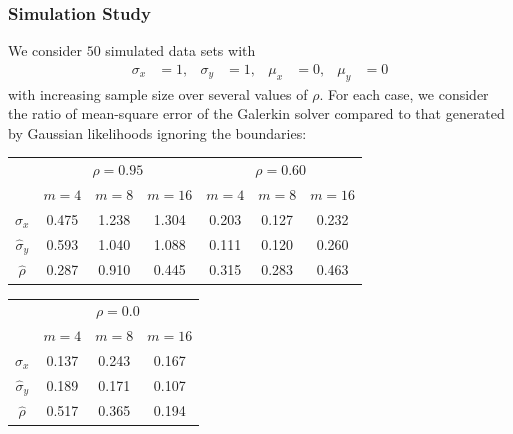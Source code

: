 \documentclass{beamer}
\begin{document}
\begin{frame}
  \frametitle{Simulation Study} We consider $50$ simulated data sets with
  \begin{align*}
    \sigma_x &= 1, & \sigma_y &= 1, & \mu_x &= 0, & \mu_y &= 0
  \end{align*}
  with increasing sample size over several values of $\rho$. For each
  case, we consider the ratio of mean-square error of the Galerkin
  solver compared to that generated by Gaussian likelihoods ignoring the boundaries:
  \begin{table}  
  \centering
  \begin{tabular}{cccc|ccc}
    &  \multicolumn{3}{c}{$\rho=0.95$} & \multicolumn{3}{c}{$\rho=0.60$} \\
    & $m=4$ & $m=8$ & $m=16$ & $m=4$ & $m=8$ & $m=16$ \\
    \hline
    $\hat{\sigma}_x$ & 0.475 & 1.238 & 1.304 & 0.203 & 0.127 & 0.232   \\
    \hline
    $\hat{\sigma}_y$ & 0.593 & 1.040 & 1.088 &  0.111 & 0.120 & 0.260 \\
    \hline
    $\hat{\rho}$ & 0.287 & 0.910 & 0.445 & 0.315 & 0.283 & 0.463 
  \end{tabular}
\end{table}

  \begin{table}  
  \centering
  \begin{tabular}{cccc}
    & \multicolumn{3}{c}{$\rho=0.0$}\\
    & $m=4$ & $m=8$ & $m=16$ \\
    \hline
    $\hat{\sigma}_x$ & 0.137 & 0.243 & 0.167 \\
    \hline
    $\hat{\sigma}_y$ &  0.189 & 0.171 & 0.107 \\
    \hline
    $\hat{\rho}$ &  0.517 & 0.365 & 0.194
  \end{tabular}
  \end{table}

\end{frame}
\end{document}

